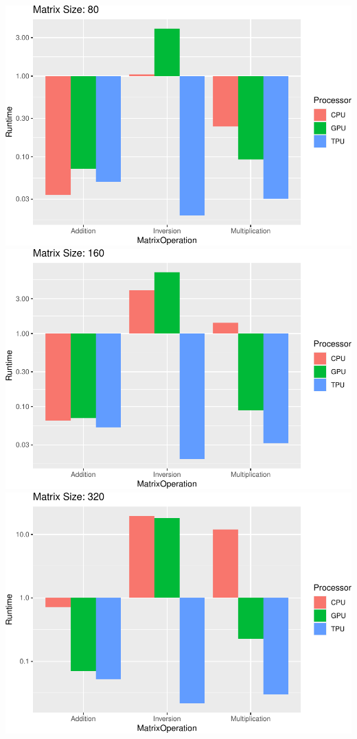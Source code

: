 \documentclass[
]{article}
\begin{document}
\includegraphics{main_files/figure-latex/unnamed-chunk-9-4.pdf}
\includegraphics{main_files/figure-latex/unnamed-chunk-9-5.pdf}
\includegraphics{main_files/figure-latex/unnamed-chunk-9-6.pdf}
\end{document}
